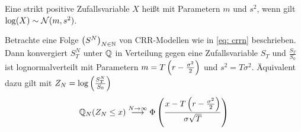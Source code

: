 \begin{*definition}
	Eine strikt positive Zufallsvariable $X$ heißt  mit Parametern $m$ und $s^2$, wenn gilt $\log(X) \sim \mathcal{N}(m,s^2)$.
\end{*definition}

\begin{theorem} %
	Betrachte eine Folge $\left( S^N \right)_{N \in \mathbb{N}}$ von CRR-Modellen wie in \eqref{eq: crrn} beschrieben. Dann konvergiert $S_T^N$ unter $\mathbb{Q}$ in Verteilung gegen eine Zufallsvariable $S_T$ und $\frac{S_T}{S_0}$ ist lognormalverteilt mit Parametern $m = T \left( r - \frac{\sigma^2}{2} \right)$ und $s^2 = T \sigma^2$. Äquivalent dazu gilt mit $Z_N = \log\left( \frac{S_T^N}{S_0} \right)$
	\begin{equation*}
	\mathbb{Q}_N(Z_N \le x) \overset{N \to \infty}{\longrightarrow} \Phi\left( \frac{x - T \left( r - \frac{\sigma^2}{2} \right)}{\sigma \sqrt{T}} \right)
	\end{equation*}
\end{theorem}
